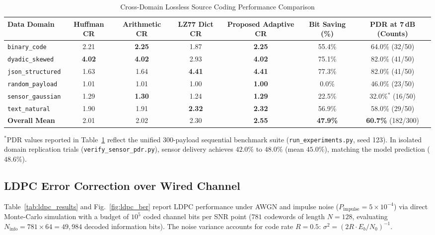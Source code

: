 \documentclass[conference]{IEEEtran}
\begin{document}
\begin{table}[!t]
\caption{Cross-Domain Lossless Source Coding Performance Comparison}
\label{tab:source_coding}
\centering
\scriptsize
\setlength{\tabcolsep}{3pt}
\begin{tabular}{lcccccc}
\toprule
\textbf{Data Domain} & \textbf{Huffman CR} & \textbf{Arithmetic CR} & \textbf{LZ77 Dict CR} & \textbf{Proposed Adaptive CR} & \textbf{Bit Saving (\%)} & \textbf{PDR at 7\,dB (Counts)} \\
\midrule
\texttt{binary\_code}     & 2.21 & \textbf{2.25} & 1.87 & \textbf{2.25} & 55.4\% & 64.0\% (32/50) \\
\texttt{dyadic\_skewed}   & \textbf{4.02} & \textbf{4.02} & 2.93 & \textbf{4.02} & 75.1\% & 82.0\% (41/50) \\
\texttt{json\_structured} & 1.63 & 1.64 & \textbf{4.41} & \textbf{4.41} & 77.3\% & 82.0\% (41/50) \\
\texttt{random\_payload}  & 1.01 & 1.01 & 1.00 & \textbf{1.00} & 0.0\%  & 46.0\% (23/50) \\
\texttt{sensor\_gaussian} & 1.29 & \textbf{1.30} & 1.24 & \textbf{1.29} & 22.5\% & 32.0\%$^*$ (16/50) \\
\texttt{text\_natural}    & 1.90 & 1.91 & \textbf{2.32} & \textbf{2.32} & 56.9\% & 58.0\% (29/50) \\
\midrule
\textbf{Overall Mean} & 2.01 & 2.02 & 2.30 & \textbf{2.55} & \textbf{47.9\%} & \textbf{60.7\%} (182/300) \\
\bottomrule
\end{tabular}

\vspace{3pt}
{\footnotesize\raggedright $^*$PDR values reported in Table~\ref{tab:source_coding} reflect the unified 300-payload sequential benchmark suite (\texttt{run\_\allowbreak experiments.py}, seed 123). In isolated domain replication trials (\texttt{verify\_\allowbreak sensor\_\allowbreak pdr.py}), sensor delivery achieves $42.0\%$ to $48.0\%$ (mean $45.0\%$), matching the model prediction ($48.6\%$).\par}
\end{table}

\subsection{LDPC Error Correction over Wired Channel}

Table~\ref{tab:ldpc_results} and Fig.~\ref{fig:ldpc_ber} report LDPC performance under AWGN and impulse noise ($P_{\text{impulse}} = 5 \times 10^{-4}$) via direct Monte-Carlo simulation with a budget of $10^5$ coded channel bits per SNR point ($781$ codewords of length $N=128$, evaluating $N_{\text{info}} = 781 \times 64 = 49{,}984$ decoded information bits). The noise variance accounts for code rate $R = 0.5$: $\sigma^2 = (2R \cdot E_b/N_0)^{-1}$.
\end{document}
